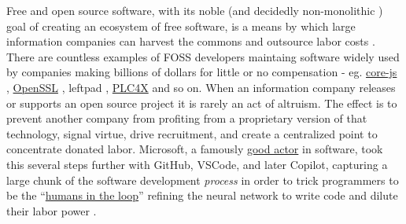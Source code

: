 Free and open source software, with its noble (and decidedly
non-monolithic \cite{liuFreedomIsnFree2018} ) goal of creating an
ecosystem of free software, is
a means by which large information companies can harvest the commons and
outsource labor costs \cite{warkHackerManifesto2004, goldsmithOriginalSinFree2019, hallidayOpenSourceNot2018, hunterReclaimingComputingCommons2016, hornPostOpenSource2020} . There
are countless examples of FOSS developers maintaing software widely used
by companies making billions of dollars for little or no compensation -
eg.
\href{https://github.com/zloirock/core-js/blob/master/docs/2023-02-14-so-whats-next.md}{core-js}
\cite{pushkarevWhatNext2023} ,
\href{https://veridicalsystems.com/blog/of-money-responsibility-and-pride/index.html}{OpenSSL}
\cite{marquessSpeedsFeedsMoney2014} , leftpad \cite{gallagherRagequitCoderUnpublished2016} ,
\href{https://github.com/chrisdutz/blog/blob/main/plc4x/free-trial-expired.adoc}{PLC4X}
\cite{dutzYourFreeTrial2022}  and so on. When an information
company releases or supports an open source project it is rarely an act
of altruism. The effect is to prevent another company from profiting
from a proprietary version of that technology, signal virtue, drive
recruitment, and create a centralized point to concentrate donated
labor. Microsoft, a famously
\href{https://en.wikipedia.org/wiki/Embrace,_extend,_and_extinguish}{good
actor} in software, took this several steps further with GitHub, VSCode,
and later Copilot, capturing a large chunk of the software development
\emph{process} in order to trick programmers to be the
``\href{https://twitter.com/json_dirs/status/1410897161277956097}{humans
in the loop}'' refining the neural network to write code and dilute
their labor power \cite{butterickGitHubCopilotInvestigation2022, butterickGitHubCopilotLitigation2022, olearyVSCodeWhat2022, VSCodiumOpenSource} .


